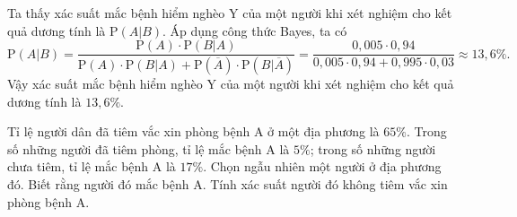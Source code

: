 \begin{bt}
{\begin{center}
		\end{center}
		Ta  thấy xác suất mắc bệnh hiểm nghèo Y của một người khi xét nghiệm cho kết quả dương tính là $\mathrm{P} \left(A|B\right)$. Áp dụng công thức Bayes, ta có
		$$\mathrm{P} \left(A|B\right)=\dfrac{\mathrm{P} \left(A\right) \cdot \mathrm{P}\left(B|A\right)}{\mathrm{P}\left(A\right) \cdot \mathrm{P}\left(B|A\right)+\mathrm{P} \left(\overline{A}\right) \cdot \mathrm{P} \left(B|\overline{A}\right)}=\dfrac{0{,}005 \cdot 0{,}94}{0{,}005 \cdot 0{,}94+0{,}995 \cdot  0{,}03}\approx 13{,}6\%.$$
		Vậy xác suất mắc bệnh hiểm nghèo Y của  một người khi xét nghiệm cho kết quả dương tính là $13{,}6\%$.
	 }
\end{bt}

\begin{bt}%
	Tỉ lệ người dân đã tiêm vắc xin phòng bệnh A ở một địa phương là $65\%$. Trong số những người đã tiêm phòng, tỉ lệ mắc bệnh A là $5\%$; trong số những người chưa tiêm, tỉ lệ mắc bệnh A là $17\%$. Chọn ngẫu nhiên một người ở địa phương đó. Biết rằng người đó mắc bệnh A. Tính xác suất người đó không tiêm vắc xin  phòng bệnh A.
\end{bt}

